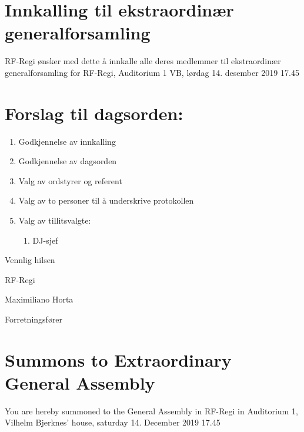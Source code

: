 \documentclass[a4paper]{article}
\begin{document}
\section*{\textsf{\textbf{\huge Innkalling til ekstraordinær generalforsamling}}}
\vspace{1cm}

RF-Regi ønsker med dette å innkalle alle deres medlemmer til ekstraordinær generalforsamling
for RF-Regi, Auditorium 1 VB, lørdag 14. desember 2019 17.45


\section*{\textsf{Forslag til dagsorden:}}
\begin{enumerate}
    \item Godkjennelse av innkalling
    \item Godkjennelse av dagsorden
    \item Valg av ordstyrer og referent
    \item Valg av to personer til å underskrive protokollen
    \item Valg av tillitsvalgte:
    \begin{enumerate}
      \item DJ-sjef
    \end{enumerate}
\end{enumerate}

\vspace{2.5cm}

Vennlig hilsen

RF-Regi

Maximiliano Horta

Forretningsfører

\newpage

\section*{\textsf{\textbf{\huge Summons to Extraordinary General Assembly}}}
\vspace{1cm}

You are hereby summoned to the General Assembly in RF-Regi in Auditorium 1,
Vilhelm Bjerknes' house, saturday 14. December 2019 17.45
\end{document}
